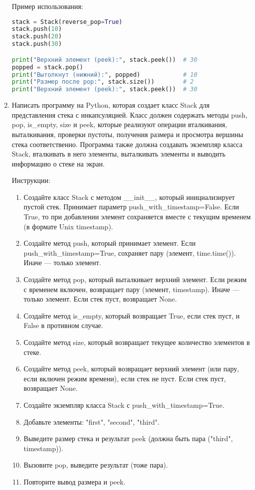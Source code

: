 \begin{enumerate}
Пример использования:
\begin{lstlisting}[language=Python]
stack = Stack(reverse_pop=True)
stack.push(10)
stack.push(20)
stack.push(30)

print("Верхний элемент (peek):", stack.peek())  # 30
popped = stack.pop()
print("Вытолкнут (нижний):", popped)            # 10
print("Размер после pop:", stack.size())        # 2
print("Верхний элемент (peek):", stack.peek())  # 30
\end{lstlisting}

\item Написать программу на Python, которая создает класс Stack для представления стека с инкапсуляцией. Класс должен содержать методы push, pop, is\_empty, size и peek, которые реализуют операции вталкивания, выталкивания, проверки пустоты, получения размера и просмотра вершины стека соответственно. Программа также должна создавать экземпляр класса Stack, вталкивать в него элементы, выталкивать элементы и выводить информацию о стеке на экран.

Инструкции:
\begin{enumerate}
    \item Создайте класс Stack с методом \_\_init\_\_, который инициализирует пустой стек. Принимает параметр push\_with\_timestamp=False. Если True, то при добавлении элемент сохраняется вместе с текущим временем (в формате Unix timestamp).
    \item Создайте метод push, который принимает элемент. Если push\_with\_timestamp=True, сохраняет пару (элемент, time.time()). Иначе — только элемент.
    \item Создайте метод pop, который выталкивает верхний элемент. Если режим с временем включен, возвращает пару (элемент, timestamp). Иначе — только элемент. Если стек пуст, возвращает None.
    \item Создайте метод is\_empty, который возвращает True, если стек пуст, и False в противном случае.
    \item Создайте метод size, который возвращает текущее количество элементов в стеке.
    \item Создайте метод peek, который возвращает верхний элемент (или пару, если включен режим времени), если стек не пуст. Если стек пуст, возвращает None.
    \item Создайте экземпляр класса Stack с push\_with\_timestamp=True.
    \item Добавьте элементы: "first", "second", "third".
    \item Выведите размер стека и результат peek (должна быть пара ("third", timestamp)).
    \item Вызовите pop, выведите результат (тоже пара).
    \item Повторите вывод размера и peek.
\end{enumerate}


\end{enumerate}
